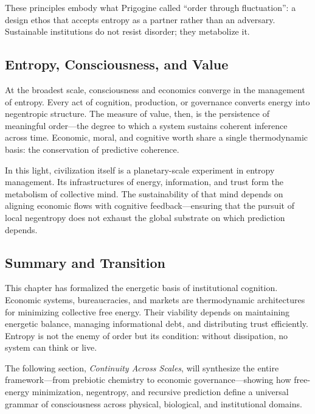 \documentclass[11pt,a4paper]{article}
\begin{document}
These principles embody what Prigogine called “order through fluctuation”: a design ethos that accepts entropy as a partner rather than an adversary.  Sustainable institutions do not resist disorder; they metabolize it.

\subsection{Entropy, Consciousness, and Value}

At the broadest scale, consciousness and economics converge in the management of entropy.  Every act of cognition, production, or governance converts energy into negentropic structure.  The measure of value, then, is the persistence of meaningful order—the degree to which a system sustains coherent inference across time.  Economic, moral, and cognitive worth share a single thermodynamic basis: the conservation of predictive coherence.

In this light, civilization itself is a planetary-scale experiment in entropy management.  Its infrastructures of energy, information, and trust form the metabolism of collective mind.  The sustainability of that mind depends on aligning economic flows with cognitive feedback—ensuring that the pursuit of local negentropy does not exhaust the global substrate on which prediction depends.

\subsection{Summary and Transition}

This chapter has formalized the energetic basis of institutional cognition.  Economic systems, bureaucracies, and markets are thermodynamic architectures for minimizing collective free energy.  Their viability depends on maintaining energetic balance, managing informational debt, and distributing trust efficiently.  Entropy is not the enemy of order but its condition: without dissipation, no system can think or live.

The following section, \textit{Continuity Across Scales}, will synthesize the entire framework—from prebiotic chemistry to economic governance—showing how free-energy minimization, negentropy, and recursive prediction define a universal grammar of consciousness across physical, biological, and institutional domains.

\end{document}
